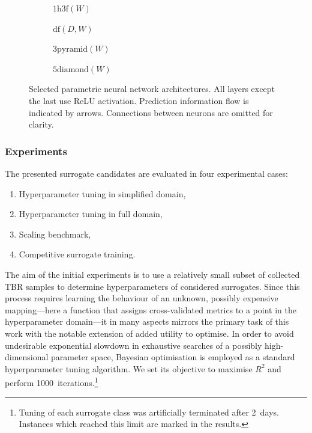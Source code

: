 \begin{figure}[h]
	\centering
	\begin{subfigure}[b]{0.25\textwidth}
		\centering
		{\scriptsize {}}
		\caption{$\text{1h3f}(W)$}
	\end{subfigure}\hfill%
	\begin{subfigure}[b]{0.25\textwidth}
		\centering
		{\scriptsize {}}
		\caption{$\text{df}(D,W)$}
	\end{subfigure}\hfill%
	\begin{subfigure}[b]{0.25\textwidth}
		\centering
		{\scriptsize {}}
		\caption{$\text{3pyramid}(W)$}
	\end{subfigure}\hfill%
	\begin{subfigure}[b]{0.25\textwidth}
		\centering
		{\scriptsize {}}
		\caption{$\text{5diamond}(W)$}
	\end{subfigure}

	\caption{Selected parametric neural network architectures. All layers except
		the last use ReLU activation. Prediction information flow is indicated by
		arrows. Connections between neurons are omitted for clarity.}
	\label{fig:nn-archs}
\end{figure}

\subsubsection{Experiments}
\label{sec:experiment-methodology}

The presented surrogate candidates are evaluated in four experimental cases:%
\begin{enumerate}
	\item Hyperparameter tuning in simplified domain,

	\item Hyperparameter tuning in full domain,

	\item Scaling benchmark,

	\item Competitive surrogate training.
\end{enumerate}

The aim of the initial experiments is to use a relatively small subset of
collected TBR samples to determine hyperparameters of considered surrogates.
Since this process requires learning the behaviour of an unknown, possibly
expensive mapping---here a function that assigns cross-validated metrics to a
point in the hyperparameter domain---it in many aspects mirrors
the primary task of this work with the notable extension of added utility
to optimise. In order to avoid undesirable exponential slowdown in exhaustive
searches of a possibly high-dimensional parameter space, Bayesian
optimisation is employed as a standard hyperparameter tuning algorithm. We set
its objective to maximise $R^2$ and perform 1000~iterations.\footnote{Tuning of
	each surrogate class was artificially terminated after 2~days. Instances
	which reached this limit are marked in the results.}

